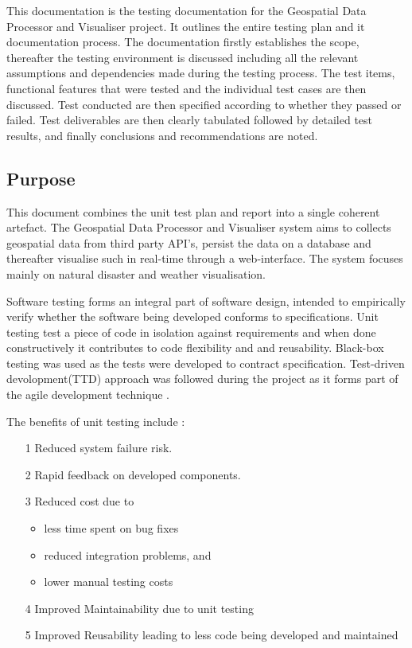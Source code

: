 This documentation is the testing documentation for the Geospatial Data Processor and Visualiser project. It outlines the entire testing plan and it documentation process. The documentation firstly establishes the scope, thereafter the testing environment is discussed including all the relevant assumptions and dependencies made during the testing process. The test items, functional features that were tested and the individual test cases are then discussed. Test conducted are then specified according to whether they passed or failed. Test deliverables are then clearly tabulated followed by detailed test results, and finally conclusions and recommendations are noted.

\subsection{Purpose}

This document combines the unit test plan and report into a single coherent artefact. The Geospatial Data Processor and Visualiser system aims to collects geospatial data from third party API's, persist the data on a database and thereafter visualise such in real-time through a web-interface. The system focuses mainly on natural disaster and weather visualisation. 


Software testing forms an integral part of software design, intended to empirically verify whether the software being developed conforms to specifications. Unit testing test a piece of code in isolation against requirements and when done constructively it contributes to code flexibility and and reusability. Black-box testing was used as the tests were developed to contract specification. Test-driven devolopment(TTD) approach was followed during the project as it forms part of the agile development technique \cite{unitTesting}.

The benefits of unit testing include \cite{unitTesting}:
\begin{enumerate}
	\item[1]Reduced system failure risk.
	
	\item[2]Rapid feedback on developed components.
	
	\item[3]Reduced cost due to
	\begin{itemize}
		\item less time spent on bug fixes
		\item reduced integration problems, and 
		\item lower manual testing costs
	\end{itemize}
	
	\item[4]Improved Maintainability due to unit testing
	
	\item[5]Improved Reusability leading to less code being developed and maintained
\end{enumerate}

